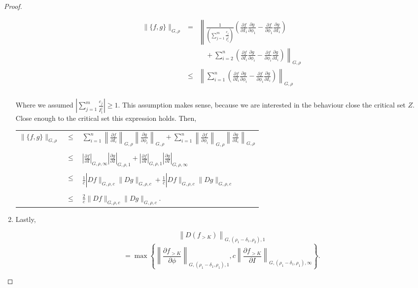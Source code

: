 \begin{proof}
\begin{enumerate}
$$
\begin{array}{rcl}
\|\{f,g\}\|_{G, \rho} & = & \displaystyle \left\|\frac{1}{\left(\sum_{j=1}^m\frac{c_j}{ I_1^j}\right)}\left(\frac{\partial f}{\partial I_1}\frac{\partial g}{\partial \phi_1} - \frac{\partial f}{\partial \phi_1}\frac{\partial g}{\partial I_1}\right)\right. \\
& & \quad \displaystyle+ \left.\sum_{i = 2}^n \left(\frac{\partial f}{\partial I_i}\frac{\partial g}{\partial \phi_i} - \frac{\partial f}{\partial \phi_i}\frac{\partial g}{\partial I_i}\right) \right\|_{G, \rho} \\
& \leq & \displaystyle \left\|\sum_{i = 1}^n \left(\frac{\partial f}{\partial I_i}\frac{\partial g}{\partial \phi_i} - \frac{\partial f}{\partial \phi_i}\frac{\partial g}{\partial I_i}\right) \right\|_{G, \rho} \\
\end{array}
$$

Where we assumed $\left|\sum_{j=1}^m\frac{c_j}{ I_1^j}\right| \geq 1$. This assumption makes sense, because we are interested in the behaviour close the critical set $Z$. Close enough to the critical set this expression holds. Then,

\begin{longtable}{rcl}
$\|\{f,g\}\|_{G, \rho}$ & $\leq$ & $\displaystyle \sum_{i = 1}^n \left\|\frac{\partial f}{\partial I_i}\right\|_{G, \rho}\left\|\frac{\partial g}{\partial \phi_i}\right\|_{G, \rho} +\sum_{i = 1}^n \left\|\frac{\partial f}{\partial \phi_i}\right\|_{G, \rho}\left\|\frac{\partial g}{\partial I_i}\right\|_{G, \rho}$\\
\\
& $\leq$ & $\displaystyle \left|\frac{\partial f}{\partial I}\right|_{G,\rho,\infty} \left|\frac{\partial g}{\partial I}\right|_{G,\rho,1} + \left|\frac{\partial f}{\partial I}\right|_{G,\rho,1} \left|\frac{\partial g}{\partial I}\right|_{G,\rho,\infty}$\\
\\
& $\leq$ & $\displaystyle \frac{1}{c}|Df\|_{G,\rho,c}\|Dg\|_{G,\rho,c} + \frac{1}{c}|Df\|_{G,\rho,c}\|Dg\|_{G,\rho,c}$\\
\\
& $\leq$ & $\displaystyle \frac{2}{c}\|Df\|_{G,\rho,c}\|Dg\|_{G,\rho,c}.$
\end{longtable}


\item Lastly,

$$
\left\|D(f_{>K})\right\|_{G,(\rho_1 - \delta_1,\rho_2),1} $$
$$= \max \left\{ \left\|\frac{\partial f_{>K}}{\partial \phi}\right\|_{G, (\rho_1-\delta_1, \rho_1), 1}, c\left\|\frac{\partial f_{>K}}{\partial I}\right\|_{G, (\rho_1-\delta_1, \rho_1), \infty}\right\}.
$$


\end{enumerate}
\end{proof}
